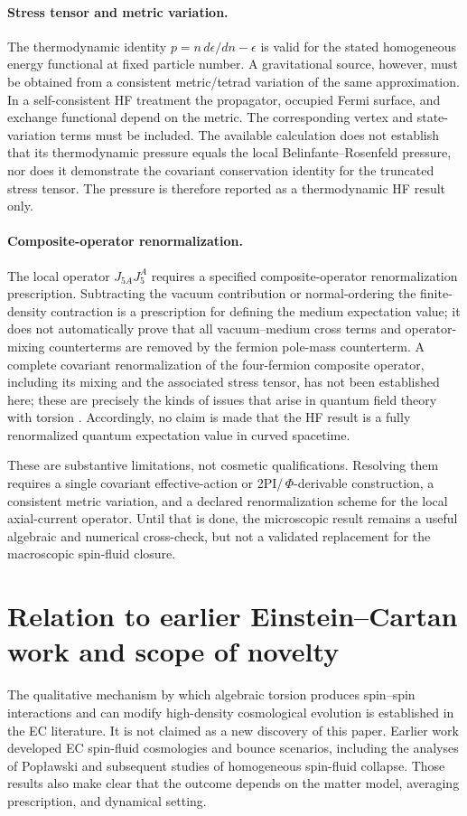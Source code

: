 \documentclass[11pt]{article}
\begin{document}
\paragraph{Stress tensor and metric variation.}
The thermodynamic identity $p=n\,d\epsilon/dn-\epsilon$ is valid for the stated homogeneous energy functional at fixed particle number. A gravitational source, however, must be obtained from a consistent metric/tetrad variation of the same approximation. In a self-consistent HF treatment the propagator, occupied Fermi surface, and exchange functional depend on the metric. The corresponding vertex and state-variation terms must be included. The available calculation does not establish that its thermodynamic pressure equals the local Belinfante--Rosenfeld pressure, nor does it demonstrate the covariant conservation identity for the truncated stress tensor. The pressure is therefore reported as a thermodynamic HF result only.

\paragraph{Composite-operator renormalization.}
The local operator $J_{5A}J_5^A$ requires a specified composite-operator renormalization prescription. Subtracting the vacuum contribution or normal-ordering the finite-density contraction is a prescription for defining the medium expectation value; it does not automatically prove that all vacuum--medium cross terms and operator-mixing counterterms are removed by the fermion pole-mass counterterm. A complete covariant renormalization of the four-fermion composite operator, including its mixing and the associated stress tensor, has not been established here; these are precisely the kinds of issues that arise in quantum field theory with torsion \cite{Shapiro2002}. Accordingly, no claim is made that the HF result is a fully renormalized quantum expectation value in curved spacetime.

These are substantive limitations, not cosmetic qualifications. Resolving them requires a single covariant effective-action or 2PI/\,$\Phi$-derivable construction, a consistent metric variation, and a declared renormalization scheme for the local axial-current operator. Until that is done, the microscopic result remains a useful algebraic and numerical cross-check, but not a validated replacement for the macroscopic spin-fluid closure.

\section{Relation to earlier Einstein--Cartan work and scope of novelty}
The qualitative mechanism by which algebraic torsion produces spin--spin interactions and can modify high-density cosmological evolution is established in the EC literature. It is not claimed as a new discovery of this paper. Earlier work developed EC spin-fluid cosmologies and bounce scenarios, including the analyses of Pop\l{}awski and subsequent studies of homogeneous spin-fluid collapse. Those results also make clear that the outcome depends on the matter model, averaging prescription, and dynamical setting.
\end{document}
